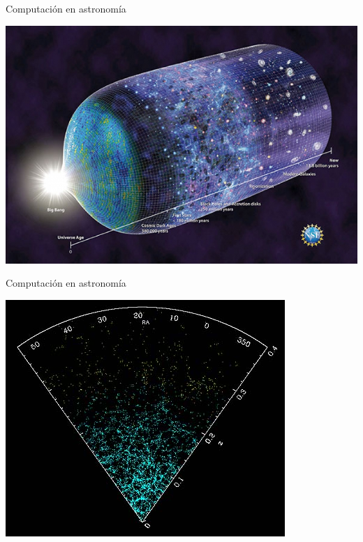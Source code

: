 \documentclass[10pt,xcolor={dvipsnames}]{beamer}
\begin{document}
\begin{frame}{Computación en astronomía}
\begin{center}
\includegraphics[scale=0.3]{Figures/Cosmologia}
\end{center}
\end{frame}


\begin{frame}{Computación en astronomía}
\begin{center}
\includegraphics[scale=0.5]{Figures/Cosmo}
\end{center}
\end{frame}
\end{document}
